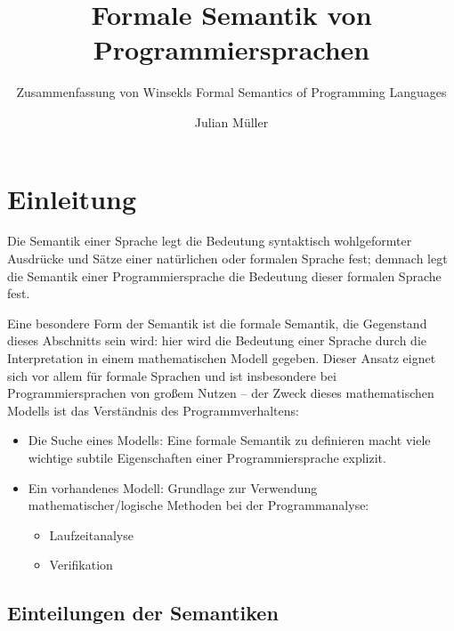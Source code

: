 \documentclass{scrartcl}
\title{Formale Semantik von Programmiersprachen}
\subtitle{Zusammenfassung von Winsekls Formal Semantics of Programming Languages}
\author{Julian Müller}
\begin{document}
\maketitle
\tableofcontents
\newpage

\section{Einleitung}

Die Semantik einer Sprache legt die Bedeutung syntaktisch wohlgeformter 
Ausdrücke und Sätze einer natürlichen oder formalen Sprache fest;
demnach legt die Semantik einer Programmiersprache die Bedeutung dieser 
formalen Sprache fest.

Eine besondere Form der Semantik ist die formale Semantik, die Gegenstand 
dieses Abschnitts sein wird: hier wird die Bedeutung einer Sprache durch die 
Interpretation in einem mathematischen Modell gegeben.
Dieser Ansatz eignet sich vor allem für formale Sprachen und ist insbesondere 
bei Programmiersprachen von großem Nutzen -- der Zweck dieses 
mathematischen Modells ist das Verständnis des Programmverhaltens:
\begin{itemize}
\item Die Suche eines Modells:
   Eine formale Semantik zu definieren macht viele wichtige subtile Eigenschaften 
   einer Programmiersprache explizit.
\item Ein vorhandenes Modell:
    Grundlage zur Verwendung mathematischer/logische Methoden bei der Programmanalyse:
    \begin{itemize}
    \item Laufzeitanalyse
    \item Verifikation
    \end{itemize}
\end{itemize}


\subsection{Einteilungen der Semantiken}
\end{document}
